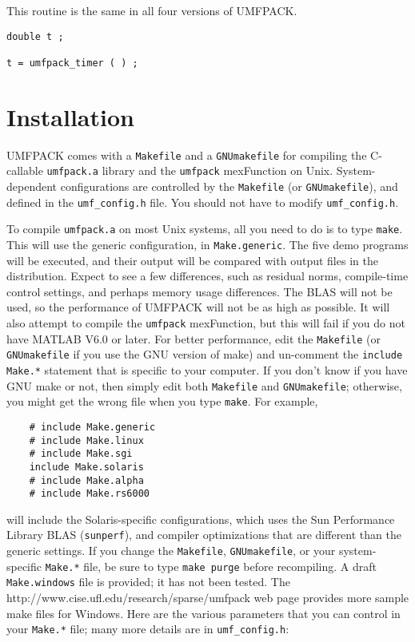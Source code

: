 This routine is the same in all four versions of UMFPACK.

{\footnotesize
\begin{verbatim}
double t ;

t = umfpack_timer ( ) ;

\end{verbatim}
}

\section{Installation}
\label{Install}

UMFPACK comes with a {\tt Makefile} and a {\tt GNUmakefile}
for compiling the C-callable {\tt umfpack.a}
library and the {\tt umfpack} mexFunction on Unix.  System-dependent
configurations are controlled by the {\tt Makefile} (or {\tt GNUmakefile}),
and defined in the {\tt umf\_config.h} file.  You should not have to modify
{\tt umf\_config.h}.

To compile {\tt umfpack.a} on most Unix systems, all you need to do is to type
{\tt make}.  This will use the generic configuration, in {\tt Make.generic}.
The five demo programs will be executed, and their output
will be compared with output files in the distribution.
Expect to see a few differences, such as residual norms, compile-time control
settings, and perhaps memory usage differences.  The
BLAS \cite{DaydeDuff99,ACM679a,ATLAS}
will not be used, so the performance of UMFPACK will not be as high as possible.
It will also attempt to compile the {\tt umfpack} mexFunction, but this
will fail if you do not have MATLAB V6.0 or later.
For better performance, edit the {\tt Makefile} (or {\tt GNUmakefile} if you
use the GNU version of make) and un-comment the
{\tt include Make.*} statement that is specific to your computer.
If you don't know if you have GNU make or not, then simply edit both
{\tt Makefile} and {\tt GNUmakefile}; otherwise, you might get the wrong
file when you type {\tt make}.  For example,
%
{\footnotesize
\begin{verbatim}
    # include Make.generic
    # include Make.linux
    # include Make.sgi
    include Make.solaris
    # include Make.alpha
    # include Make.rs6000
\end{verbatim}
}
%
will include the Solaris-specific configurations, which uses the Sun Performance
Library BLAS ({\tt sunperf}), and compiler optimizations that are different than
the generic settings.  If you change the {\tt Makefile}, {\tt GNUmakefile},
or your system-specific
{\tt Make.*} file, be sure to type {\tt make purge} before recompiling.
A draft {\tt Make.windows} file is provided; it has not been tested.
The http://www.cise.ufl.edu/research/sparse/umfpack web page provides
more sample make files for Windows.
Here are the various parameters that you can control in your {\tt Make.*}
file; many more details are in {\tt umf\_config.h}:

